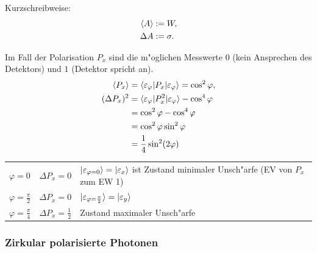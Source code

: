 \documentclass[a4paper]{scrartcl}
\begin{document}
{\begin{iaufz}
Kurzschreibweise:
\begin{align}
\begin{split}
\braket A & := W, \\
\Delta A & := \sigma.
\end{split}
\end{align}
\end{iaufz}
Im Fall der Polarisation $P_x$ sind die m"oglichen Messwerte $0$ (kein Ansprechen des Detektors) und $1$ (Detektor spricht an).
\begin{align}
\braket {P_x} & = \braket { \varepsilon_\varphi | P_x | \varepsilon_\varphi } = \cos^2 \varphi, \\
(\Delta P_x )^2 & = \braket { \varepsilon_\varphi | P_x^2 | \varepsilon_\varphi } - \cos^4 \varphi \notag \\
& = \cos^2 \varphi - \cos^4 \varphi \notag \\
& = \cos^2 \varphi \sin^2 \varphi \notag \\
& = \frac14 \sin^2(2 \varphi)
\end{align}

\begin{tabular}{l l p{300pt}}
$\varphi=0$ &  $\Delta P_x = 0$ &  $\ket { \varepsilon_{\varphi = 0}} = \ket { \varepsilon_x }$ ist Zustand minimaler Unsch"arfe (EV von $P_x$ zum EW 1) \\
$\varphi = \frac \pi 2$ & $\Delta P_x = 0$ & $\ket {\varepsilon_{\varphi = \frac \pi 2}} = \ket{ \varepsilon_y}$ \\
$\varphi = \frac \pi 4$ & $\Delta P_x = \frac12$ & Zustand maximaler Unsch"arfe
\end{tabular}

\subsubsection*{Zirkular polarisierte Photonen}

}
\end{document}
